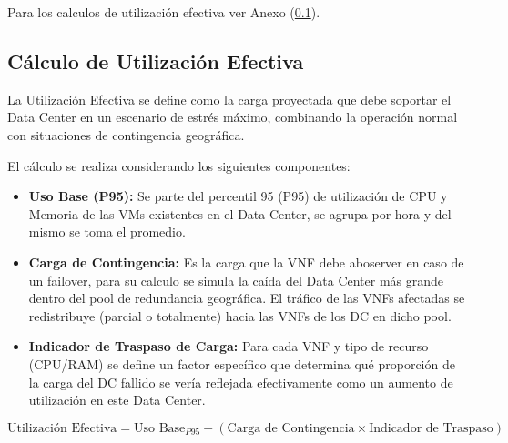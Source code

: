 \documentclass[11pt,a4paper]{article}
\begin{document}
Para los calculos de utilización efectiva ver Anexo (\ref{sec:calculo_utilizacion_efectiva}).

\subsection{Cálculo de Utilización Efectiva}
\label{sec:calculo_utilizacion_efectiva}
La Utilización Efectiva se define como la carga proyectada que debe soportar el Data Center en un escenario de estrés máximo, combinando la operación normal con situaciones de contingencia geográfica.

El cálculo se realiza considerando los siguientes componentes:
\begin{itemize}
    \item \textbf{Uso Base (P95):} Se parte del percentil 95 (P95) de utilización de CPU y Memoria de las VMs existentes en el Data Center, se agrupa por hora y del mismo se toma el promedio.
    \item \textbf{Carga de Contingencia:} Es la carga que la VNF debe aboserver en caso de un failover, para su calculo se simula la caída del Data Center más grande dentro del pool de redundancia geográfica. El tráfico de las VNFs afectadas se redistribuye (parcial o totalmente) hacia las VNFs de los DC en dicho pool. 
    \item \textbf{Indicador de Traspaso de Carga:} Para cada VNF y tipo de recurso (CPU/RAM) se define un factor específico que determina qué proporción de la carga del DC fallido se vería reflejada efectivamente como un aumento de utilización en este Data Center.
\end{itemize}

$$ \text{Utilización Efectiva} = \text{Uso Base}_{P95} + (\text{Carga de Contingencia} \times \text{Indicador de Traspaso}) $$
\end{document}
